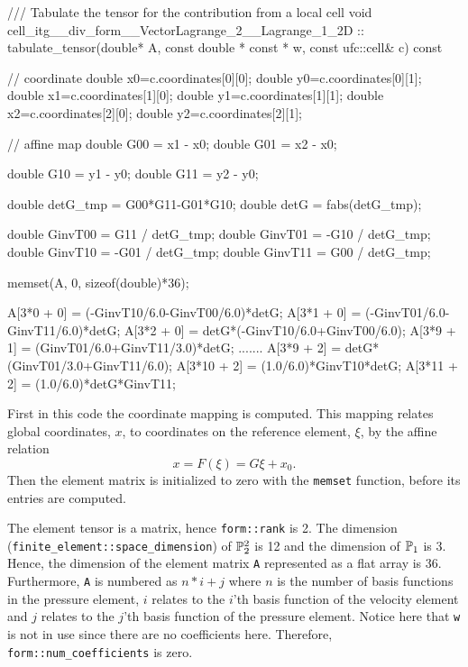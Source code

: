 \begin{code}
/// Tabulate the tensor for the contribution from a local cell
void cell_itg__div_form__VectorLagrange_2__Lagrange_1_2D ::
     tabulate_tensor(double* A, const double * const * w,
                     const ufc::cell& c) const
{
  // coordinate
  double x0=c.coordinates[0][0]; double y0=c.coordinates[0][1];
  double x1=c.coordinates[1][0]; double y1=c.coordinates[1][1];
  double x2=c.coordinates[2][0]; double y2=c.coordinates[2][1];
  
  // affine map
  double G00 = x1 - x0;
  double G01 = x2 - x0;
  
  double G10 = y1 - y0;
  double G11 = y2 - y0;
  
  double detG_tmp = G00*G11-G01*G10;
  double detG = fabs(detG_tmp);
  
  double GinvT00 =  G11 / detG_tmp;
  double GinvT01 = -G10 / detG_tmp;
  double GinvT10 = -G01 / detG_tmp;
  double GinvT11 =  G00 / detG_tmp;
  
  
  memset(A, 0, sizeof(double)*36);
  
  A[3*0 + 0] = (-GinvT10/6.0-GinvT00/6.0)*detG;
  A[3*1 + 0] = (-GinvT01/6.0-GinvT11/6.0)*detG;
  A[3*2 + 0] = detG*(-GinvT10/6.0+GinvT00/6.0);
  A[3*9 + 1] = (GinvT01/6.0+GinvT11/3.0)*detG;
  .......
  A[3*9 + 2] = detG*(GinvT01/3.0+GinvT11/6.0);
  A[3*10 + 2] = (1.0/6.0)*GinvT10*detG;
  A[3*11 + 2] = (1.0/6.0)*detG*GinvT11;
}
\end{code}

First in this code the coordinate mapping is 
computed. 
This mapping relates global coordinates, $x$, to coordinates
on the reference element, $\xi$,  by the affine relation 
\[
x = F(\xi) = G \xi + x_0. 
\]
Then the element matrix is initialized to zero with the \texttt{memset}
function, before its entries are computed. 

The element tensor is a matrix, hence \texttt{form::rank} is 2.
The dimension (\texttt{finite\_element::space\_dimension}) 
of  $\P^2_2$ is 12 and the dimension of $\P_1$ is 3.    
Hence, the dimension of the element matrix \texttt{A} represented as a    
flat array is 36.   
Furthermore, \texttt{A} is numbered as $n*i + j$ where
$n$ is the number of basis functions in the pressure element, 
$i$ relates to the $i$'th basis function of the velocity element and
$j$ relates to the $j$'th basis function of the pressure element. 
Notice here that \texttt{w} is not in use since there are no coefficients here. 
Therefore, \texttt{form::num\_coefficients} is zero.


